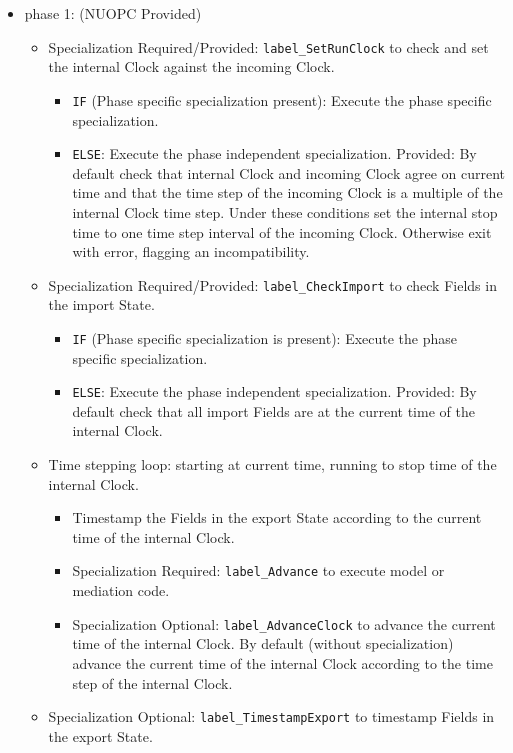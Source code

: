 \begin{itemize}
\item phase 1: ({\sc NUOPC Provided})
  \begin{itemize}
  \item {\sc Specialization Required/Provided}: {\tt label\_SetRunClock} to check and set the internal Clock against the incoming Clock.
  \begin{itemize}
  \item {\tt IF} (Phase specific specialization present): Execute the phase specific specialization.
  \item {\tt ELSE}: Execute the phase independent specialization. {\sc Provided}: By default check that internal Clock and incoming Clock agree on current time and that the time step of the incoming Clock is a multiple of the internal Clock time step. Under these conditions set the internal stop time to one time step interval of the incoming Clock. Otherwise exit with error, flagging an incompatibility.
  \end{itemize}
  \item {\sc Specialization Required/Provided}: {\tt label\_CheckImport} to check Fields in the import State.
  \begin{itemize}
  \item {\tt IF} (Phase specific specialization is present): Execute the phase specific specialization.
  \item {\tt ELSE}: Execute the phase independent specialization. {\sc Provided}: By default check that all import Fields are at the current time of the internal Clock.
  \end{itemize}
  \item Time stepping loop: starting at current time, running to stop time of the internal Clock.
  \begin{itemize}
  \item Timestamp the Fields in the export State according to the current time of the internal Clock.
  \item {\sc Specialization Required}: {\tt label\_Advance} to execute model or mediation code.
  \item {\sc Specialization Optional}: {\tt label\_AdvanceClock} to advance the current time of the internal Clock. By default (without specialization) advance the current time of the internal Clock according to the time step of the internal Clock.
  \end{itemize}
  \item {\sc Specialization Optional}: {\tt label\_TimestampExport} to timestamp Fields in the export State.
  \end{itemize}    
\end{itemize}

